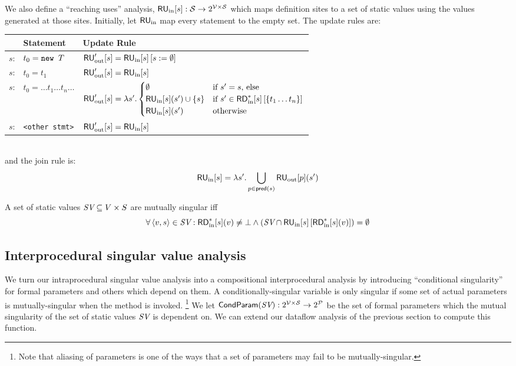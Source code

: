 \documentclass[11pt,notitlepage]{article}
\newcommand{\bigvar}[1]{\ensuremath{\text{\it #1}}}
\newcommand{\func}[1]{\ensuremath{\text{\sffamily #1}}}
\begin{document}
We also define a ``reaching uses'' analysis,
$\func{RU}_\text{in}[s] : \mathcal{S}\to 2^\mathcal{V\times S}$ which
maps definition sites to a set of static values using the values
generated at those sites.  Initially, let $\func{RU}_\text{in}$ map
every statement to the empty set.  The update rules are:
\\
\begin{tabular}{lll}
&\textbf{Statement}&\textbf{Update Rule}\\\hline
$s$: & $t_0=\text{\tt new }T$ & $\func{RU}'_\text{out}[s]=\func{RU}_\text{in}[s]\left[s:=\emptyset\right]$ \\
$s$: & $t_0=t_1$ &  $\func{RU}'_\text{out}[s]=\func{RU}_\text{in}[s]$ \\
$s$: & $t_0=\ldots t_1 \ldots t_n \ldots$ &
 $\func{RU}'_\text{out}[s]=\lambda s' . \begin{cases}
\emptyset &\text{if }s'=s\text{, else}\\
\func{RU}_\text{in}[s](s')\cup\left\{s\right\}
 & \text{if }s'\in\func{RD}^*_\text{in}[s]\left[\left\{t_1\ldots
    t_n\right\}\right] \\
\func{RU}_\text{in}[s](s') & \text{otherwise} \\
\end{cases}$ \\
$s$: & \texttt{<other stmt>} &  $\func{RU}'_\text{out}[s]=\func{RU}_\text{in}[s]$ \\
\end{tabular}
\\
and the join rule is:
\begin{displaymath}
\func{RU}_\text{in}[s] = \lambda s'.\bigcup_{p\in\func{pred}(s)} \func{RU}_\text{out}[p](s')
\end{displaymath}

A set of static values $\bigvar{SV} \subseteq V \times S$ are mutually
singular iff
\begin{displaymath}
  \forall \tuple{v,s}\in \bigvar{SV} : \func{RD}^*_\text{in}[s](v) \neq \bot
  \wedge 
  \left(\bigvar{SV}\cap\func{RU}_\text{in}[s]\left[\func{RD}^*_\text{in}[s](v)\right]\right) = \emptyset
\end{displaymath}

\subsection{Interprocedural singular value analysis}

We turn our intraprocedural singular value analysis into a compositional
interprocedural analysis by introducing ``conditional singularity''
for formal parameters and others which depend on them.  A
conditionally-singular variable is only singular if some set of actual
parameters is mutually-singular when the method is invoked.%
\footnote{Note that aliasing of parameters is one of the ways that
a set of parameters may fail to be mutually-singular.}
We let
$\func{CondParam}(\bigvar{SV}):2^\mathcal{V\times S}\to 2^\mathcal{P}$
be the set of formal parameters which the mutual singularity of the
set of static values $\bigvar{SV}$ is dependent on.  We can extend our dataflow
analysis of the previous section to compute this function.
\end{document}
